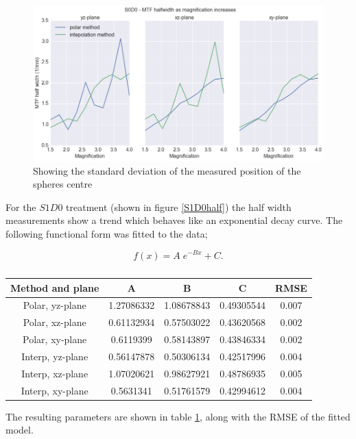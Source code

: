 \documentclass[
  twoside,
  11pt, a4paper,
  footinclude=true,
  headinclude=true,
  cleardoublepage=empty
]{scrbook}
\begin{document}
\begin{figure}[h!]
  \centering
    \includegraphics[width=\textwidth]{figures/S0D0mtf.png}
    \caption{Showing the standard deviation of the measured position of the spheres centre}
        \label{S0D0half}
\end{figure}

For the $S1D0$ treatment (shown in figure \ref{S1D0half}) the half width measurements show a trend which behaves like an exponential decay curve. The following functional form was fitted to the data;

\[
f(x) = A \; e^{-Bx} + C.
\]


\begin{table}
\caption{}
\label{loghalffit}
\begin{tabular}{c|cccc}
\toprule
{} Method and plane &     A &     B &     C  & RMSE\\
\midrule
Polar, yz-plane         &  1.27086332  &1.08678843 & 0.49305544 & 0.007\\
Polar, xz-plane        &  0.61132934 & 0.57503022 & 0.43620568 & 0.002\\
Polar, xy-plane      &  0.6119399   & 0.58143897 & 0.43846334 & 0.002\\
Interp, yz-plane       &  0.56147878 & 0.50306134 & 0.42517996 & 0.004\\
Interp, xz-plane       &  1.07020621 & 0.98627921 & 0.48786935 & 0.005\\
Interp, xy-plane       &  0.5631341  & 0.51761579 & 0.42994612  & 0.004\\
\bottomrule
\end{tabular}
\end{table}

The resulting parameters are shown in table \ref{loghalffit}, along with the RMSE of the fitted model.
\end{document}
